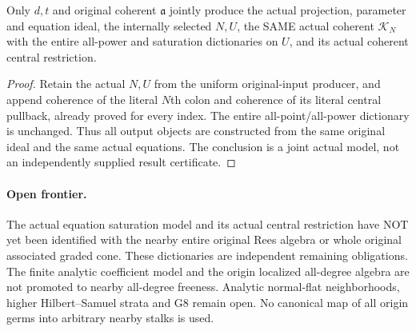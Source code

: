 \begin{theorem}
\label{hir:relative-normal-deformation-original-model}
\leanok
{}
Only $d,t$ and original coherent $\mathfrak a$ jointly produce the actual
projection, parameter and equation ideal, the internally selected $N,U$,
the SAME actual coherent $\mathcal K_N$ with the entire all-power and
saturation dictionaries on $U$, and its actual coherent central restriction.
\end{theorem}
\begin{proof}
Retain the actual $N,U$ from the uniform original-input producer, and append
coherence of the literal $N$th colon and coherence of its literal central
pullback, already proved for every index. The entire all-point/all-power
dictionary is unchanged. Thus all output objects are constructed from the
same original ideal and the same actual equations. The conclusion is a
joint actual model, not an independently supplied result certificate.
\end{proof}

\paragraph{Open frontier.}
The actual equation saturation model and its actual central restriction have
NOT yet been identified with the nearby entire original Rees algebra or
whole original associated graded cone. These dictionaries are independent
remaining obligations. The finite analytic coefficient model and the origin
localized all-degree algebra are not promoted to nearby all-degree freeness.
Analytic normal-flat neighborhoods, higher Hilbert--Samuel strata and G8
remain open. No canonical map of all origin germs into arbitrary nearby
stalks is used.
